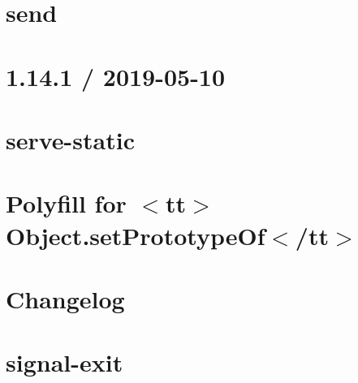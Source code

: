 \let\mypdfximage\pdfximage\def\pdfximage{\immediate\mypdfximage}\documentclass[twoside]{book}
\newcommand{\+}{\discretionary{\mbox{\scriptsize$\hookleftarrow$}}{}{}}
\begin{document}
\chapter{send}
\label{md__c_1__git_hub__p_r_o_y_e_c_t_o-_i_i_i-_g_o_t_rest-api_node_modules_send__r_e_a_d_m_e}

\chapter{1.14.1 / 2019-\/05-\/10}
\label{md__c_1__git_hub__p_r_o_y_e_c_t_o-_i_i_i-_g_o_t_rest-api_node_modules_serve-static__h_i_s_t_o_r_y}

\chapter{serve-\/static}
\label{md__c_1__git_hub__p_r_o_y_e_c_t_o-_i_i_i-_g_o_t_rest-api_node_modules_serve-static__r_e_a_d_m_e}

\chapter{Polyfill for $<$tt$>$Object.\+set\+Prototype\+Of$<$/tt$>$}
\label{md__c_1__git_hub__p_r_o_y_e_c_t_o-_i_i_i-_g_o_t_rest-api_node_modules_setprototypeof__r_e_a_d_m_e}

\chapter{Changelog}
\label{md__c_1__git_hub__p_r_o_y_e_c_t_o-_i_i_i-_g_o_t_rest-api_node_modules_signal-exit__c_h_a_n_g_e_l_o_g}

\chapter{signal-\/exit}
\label{md__c_1__git_hub__p_r_o_y_e_c_t_o-_i_i_i-_g_o_t_rest-api_node_modules_signal-exit__r_e_a_d_m_e}

\end{document}
